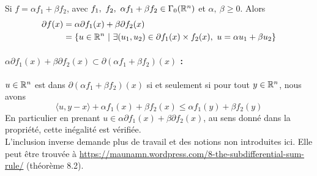 \documentclass[a4paper,12pt]{article}
\begin{document}
\begin{propriete}
Si $f = \alpha f_1+\beta f_2$, avec $f_1,\ f_2,\ \alpha f_1+\beta f_2\in\Gamma_0(\mathbb{R}^n)$ et $\alpha,\ \beta \geq 0$. Alors 
\begin{align*}
\partial f(x) &= \alpha \partial f_1(x) + \beta \partial f_2(x) \\
&= \left\{u\in\mathbb{R}^n\ |\ \exists (u_1,u_2)\in \partial f_1(x)\times f_2(x),\ u = \alpha u_1 + \beta u_2 \right\}
\end{align*}
\end{propriete}
\begin{preuve}
\vspace{-1cm}
\paragraph{$\alpha\partial f_1(x) +\beta \partial f_2(x) \subset
\partial (\alpha f_1 +\beta f_2)(x)$ :}$u\in\mathbb{R}^n$ est dans $\partial (\alpha f_1 +\beta f_2)(x)$ si et seulement si pour tout $y\in \mathbb{R}^n$, nous avons 
$$
\langle u,y-x\rangle + \alpha f_1(x) +\beta f_2(x) \leq  \alpha f_1(y) +\beta f_2(y) 
$$
En particulier en prenant $u\in \alpha\partial f_1(x) +\beta \partial f_2(x) $, au sens donné dans la propriété, cette inégalité est vérifiée. \\

L'inclusion inverse demande plus de travail et des notions non introduites ici. Elle peut être trouvée à \url{https://maunamn.wordpress.com/8-the-subdifferential-sum-rule/} (théorème 8.2).

\end{preuve}
\end{document}

